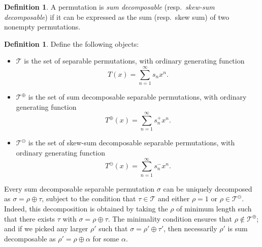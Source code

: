 \documentclass{article}
\theoremstyle{plain}
\theoremstyle{definition}
\newtheorem{defn}[theorem]{Definition}
\theoremstyle{plain}
\begin{document}
\begin{defn}
    A permutation is \emph{sum decomposable} (resp.~\emph{skew-sum
    decomposable}) if it can be expressed as the sum (resp.~skew sum) of two nonempty
    permutations.
\end{defn}

\begin{defn}
    Define the following objects:
    \begin{itemize}
        \item $\mathcal{T}$ is the set of separable permutations, with ordinary generating function
        \begin{equation*}
            T(x) = \sum_{n = 1}^\infty s_n x^n.
        \end{equation*}
        \item $\mathcal{T}^\oplus$ is the set of sum decomposable separable permutations, with ordinary generating function
        \begin{equation*}
            T^\oplus(x) = \sum_{n = 1}^\infty s_n^+ x^n.
        \end{equation*}
        \item $\mathcal{T}^\ominus$ is the set of skew-sum decomposable separable permutations, with ordinary generating function
        \begin{equation*}
            T^\ominus(x) = \sum_{n = 1}^\infty s_n^- x^n.
        \end{equation*}
    \end{itemize}
\end{defn}

Every sum decomposable separable permutation $\sigma$ can be uniquely
decomposed as $\sigma = \rho\oplus\tau$, subject to the condition that $\tau \in
\mathcal{T}$ and either $\rho = 1$ or $\rho \in\mathcal{T}^\ominus$. Indeed,
this decomposition is obtained by taking the $\rho$ of minimum length such that
there exists $\tau$ with $\sigma = \rho\oplus\tau$. The minimality condition
ensures that $\rho\notin\mathcal{T}^\oplus$; and if we picked any larger $\rho'$
such that $\sigma = \rho'\oplus\tau'$, then necessarily $\rho'$ is sum
decomposable as $\rho' = \rho\oplus\alpha$ for some $\alpha$.
\end{document}
